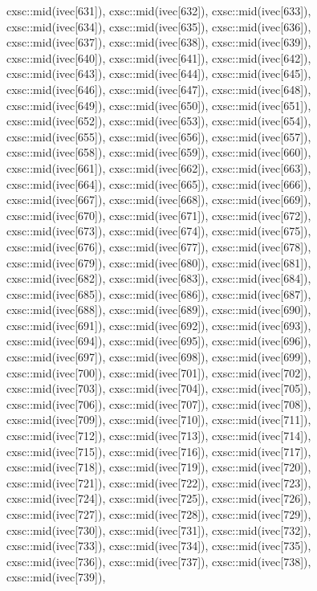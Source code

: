\begin{DoxyCode}
{  cxsc::mid(ivec[631]),
  cxsc::mid(ivec[632]),
  cxsc::mid(ivec[633]),
  cxsc::mid(ivec[634]),
  cxsc::mid(ivec[635]),
  cxsc::mid(ivec[636]),
  cxsc::mid(ivec[637]),
  cxsc::mid(ivec[638]),
  cxsc::mid(ivec[639]),
  cxsc::mid(ivec[640]),
  cxsc::mid(ivec[641]),
  cxsc::mid(ivec[642]),
  cxsc::mid(ivec[643]),
  cxsc::mid(ivec[644]),
  cxsc::mid(ivec[645]),
  cxsc::mid(ivec[646]),
  cxsc::mid(ivec[647]),
  cxsc::mid(ivec[648]),
  cxsc::mid(ivec[649]),
  cxsc::mid(ivec[650]),
  cxsc::mid(ivec[651]),
  cxsc::mid(ivec[652]),
  cxsc::mid(ivec[653]),
  cxsc::mid(ivec[654]),
  cxsc::mid(ivec[655]),
  cxsc::mid(ivec[656]),
  cxsc::mid(ivec[657]),
  cxsc::mid(ivec[658]),
  cxsc::mid(ivec[659]),
  cxsc::mid(ivec[660]),
  cxsc::mid(ivec[661]),
  cxsc::mid(ivec[662]),
  cxsc::mid(ivec[663]),
  cxsc::mid(ivec[664]),
  cxsc::mid(ivec[665]),
  cxsc::mid(ivec[666]),
  cxsc::mid(ivec[667]),
  cxsc::mid(ivec[668]),
  cxsc::mid(ivec[669]),
  cxsc::mid(ivec[670]),
  cxsc::mid(ivec[671]),
  cxsc::mid(ivec[672]),
  cxsc::mid(ivec[673]),
  cxsc::mid(ivec[674]),
  cxsc::mid(ivec[675]),
  cxsc::mid(ivec[676]),
  cxsc::mid(ivec[677]),
  cxsc::mid(ivec[678]),
  cxsc::mid(ivec[679]),
  cxsc::mid(ivec[680]),
  cxsc::mid(ivec[681]),
  cxsc::mid(ivec[682]),
  cxsc::mid(ivec[683]),
  cxsc::mid(ivec[684]),
  cxsc::mid(ivec[685]),
  cxsc::mid(ivec[686]),
  cxsc::mid(ivec[687]),
  cxsc::mid(ivec[688]),
  cxsc::mid(ivec[689]),
  cxsc::mid(ivec[690]),
  cxsc::mid(ivec[691]),
  cxsc::mid(ivec[692]),
  cxsc::mid(ivec[693]),
  cxsc::mid(ivec[694]),
  cxsc::mid(ivec[695]),
  cxsc::mid(ivec[696]),
  cxsc::mid(ivec[697]),
  cxsc::mid(ivec[698]),
  cxsc::mid(ivec[699]),
  cxsc::mid(ivec[700]),
  cxsc::mid(ivec[701]),
  cxsc::mid(ivec[702]),
  cxsc::mid(ivec[703]),
  cxsc::mid(ivec[704]),
  cxsc::mid(ivec[705]),
  cxsc::mid(ivec[706]),
  cxsc::mid(ivec[707]),
  cxsc::mid(ivec[708]),
  cxsc::mid(ivec[709]),
  cxsc::mid(ivec[710]),
  cxsc::mid(ivec[711]),
  cxsc::mid(ivec[712]),
  cxsc::mid(ivec[713]),
  cxsc::mid(ivec[714]),
  cxsc::mid(ivec[715]),
  cxsc::mid(ivec[716]),
  cxsc::mid(ivec[717]),
  cxsc::mid(ivec[718]),
  cxsc::mid(ivec[719]),
  cxsc::mid(ivec[720]),
  cxsc::mid(ivec[721]),
  cxsc::mid(ivec[722]),
  cxsc::mid(ivec[723]),
  cxsc::mid(ivec[724]),
  cxsc::mid(ivec[725]),
  cxsc::mid(ivec[726]),
  cxsc::mid(ivec[727]),
  cxsc::mid(ivec[728]),
  cxsc::mid(ivec[729]),
  cxsc::mid(ivec[730]),
  cxsc::mid(ivec[731]),
  cxsc::mid(ivec[732]),
  cxsc::mid(ivec[733]),
  cxsc::mid(ivec[734]),
  cxsc::mid(ivec[735]),
  cxsc::mid(ivec[736]),
  cxsc::mid(ivec[737]),
  cxsc::mid(ivec[738]),
  cxsc::mid(ivec[739]),
}
\end{DoxyCode}
